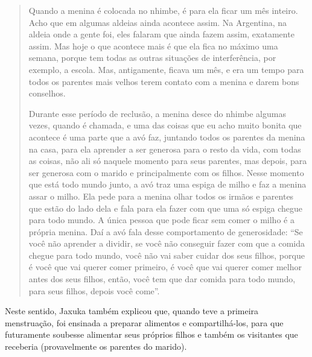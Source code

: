 \begin{quotation}
Quando a menina é colocada no nhimbe, é para ela ficar um mês inteiro.
Acho que em algumas aldeias ainda acontece assim. Na Argentina, na
aldeia onde a gente foi, eles falaram que ainda fazem assim, exatamente
assim. Mas hoje o que acontece mais é que ela fica no máximo uma
semana, porque tem todas as outras situações de interferência, por
exemplo, a escola. Mas, antigamente, ficava um mês, e era um tempo para
todos os parentes mais velhos terem contato com a menina e darem bons
conselhos. 

Durante esse período de reclusão, a menina desce do nhimbe algumas
vezes, quando é chamada, e uma das coisas que eu acho muito bonita que
acontece é uma parte que a avó faz, juntando todos os parentes da
menina na casa, para ela aprender a ser generosa para o resto da vida,
com todas as coisas, não ali só naquele momento para seus parentes, mas
depois, para ser generosa com o marido e principalmente com os filhos.
Nesse momento que está todo mundo junto, a avó traz uma espiga de milho
e faz a menina assar o milho. Ela pede para a menina olhar todos os
irmãos e parentes que estão do lado dela e fala para ela fazer com que
uma só espiga chegue para todo mundo. A única pessoa que pode ficar sem
comer o milho é a própria menina. Daí a avó fala desse comportamento de
generosidade: ``Se você não aprender a dividir, se você não conseguir
fazer com que a comida chegue para todo mundo, você não vai saber
cuidar dos seus filhos, porque é você que vai querer comer primeiro, é
você que vai querer comer melhor antes dos seus filhos, então, você tem
que dar comida para todo mundo, para seus filhos, depois você come''. 

\end{quotation}
Neste sentido, Jaxuka também explicou que, quando teve a primeira
menstruação, foi ensinada a preparar alimentos e compartilhá-los, para
que futuramente soubesse alimentar seus próprios filhos e também os
visitantes que receberia (provavelmente os parentes do marido).

